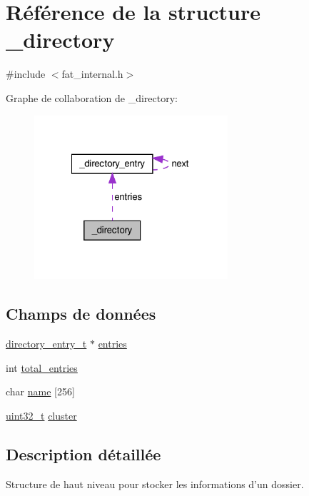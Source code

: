 \hypertarget{struct__directory}{\section{\-Référence de la structure \-\_\-directory}
\label{struct__directory}
}


{\ttfamily \#include $<$fat\-\_\-internal.\-h$>$}



\-Graphe de collaboration de \-\_\-directory\-:\nopagebreak
\begin{figure}[H]
\begin{center}
\leavevmode
\includegraphics[width=203pt]{struct__directory__coll__graph}
\end{center}
\end{figure}
\subsection*{\-Champs de données}
\begin{DoxyCompactItemize}
\item 
\hyperlink{fat__internal_8h_ab6546cb0abf935a615fae20884a41818}{directory\-\_\-entry\-\_\-t} $\ast$ \hyperlink{struct__directory_a2aa96162372442698a14e116ce88110d}{entries}
\item 
int \hyperlink{struct__directory_aeb73476149e19828774d4dfbd96a051f}{total\-\_\-entries}
\item 
char \hyperlink{struct__directory_a535c678fe29215d35ac64200865147a4}{name} \mbox{[}256\mbox{]}
\item 
\hyperlink{types_8h_a33594304e786b158f3fb30289278f5af}{uint32\-\_\-t} \hyperlink{struct__directory_a5a45241095c7fb2a39f158638631ddbc}{cluster}
\end{DoxyCompactItemize}


\subsection{\-Description détaillée}
\-Structure de haut niveau pour stocker les informations d'un dossier. 


